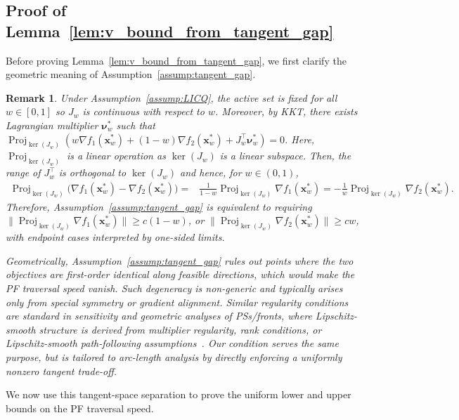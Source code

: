 \documentclass{article}
\newtheorem{remark}{Remark}
\newcommand{\bx}{\mathbf{x}}
\newcommand{\Proj}{\operatorname{Proj}}
\begin{document}
\subsection{Proof of Lemma~\ref{lem:v_bound_from_tangent_gap}}
\label{appendix:v_bound_from_tangent_gap}

Before proving Lemma~\ref{lem:v_bound_from_tangent_gap}, we first clarify the geometric meaning of Assumption~\ref{assump:tangent_gap}.
\begin{remark}
\label{remark: vbound}
Under Assumption~\ref{assump:LICQ}, the active set is fixed for all $w\in[0,1]$ so $J_w$ is continuous with respect to $w$. Moreover, by KKT, there exists Lagrangian multiplier $\boldsymbol{\nu}_w^*$ such that $\Proj_{\ker(J_w)}\left( w \nabla f_1(\bx_w^*) + (1-w) \nabla f_2(\bx_w^*) + J_w^\top \boldsymbol{\nu}_w^* \right)= 0$.
Here, $\Proj_{\ker(J_w)}$ is a linear operation as $\ker(J_w)$ is a linear subspace. Then, the range of $J_w^\top$ is orthogonal to $\ker(J_w)$ and hence, for $w\in(0,1)$,
\begin{align*}
\Proj_{\ker(J_w)}\big(\nabla f_1(\bx_w^*)-\nabla f_2(\bx_w^*)\big)
= & \frac{1}{1-w}\Proj_{\ker(J_w)}\nabla f_1(\bx_w^*)
= -\frac{1}{w}\Proj_{\ker(J_w)}\nabla f_2(\bx_w^*).
\end{align*}
Therefore, Assumption~\ref{assump:tangent_gap} is equivalent to requiring $\|\Proj_{\ker(J_w)}\nabla f_1(\bx_w^*)\| \ge c(1-w)$, or $\|\Proj_{\ker(J_w)}\nabla f_2(\bx_w^*)\| \ge c w$, with endpoint cases interpreted by one-sided limits.

Geometrically, Assumption~\ref{assump:tangent_gap} rules out points where the two objectives are first-order identical along feasible directions, which would make the PF traversal speed vanish. Such degeneracy is non-generic and typically arises only from special symmetry or gradient alignment. Similar regularity conditions are standard in sensitivity and geometric analyses of PSs/fronts, where Lipschitz-smooth structure is derived from multiplier regularity, rank conditions, or Lipschitz-smooth path-following assumptions~\citep{hamada2020topology,bolten2021tracing}. Our condition serves the same purpose, but is tailored to arc-length analysis by directly enforcing a uniformly nonzero tangent trade-off.
\end{remark}

We now use this tangent-space separation to prove the uniform lower and upper bounds on the PF traversal speed.
\end{document}
